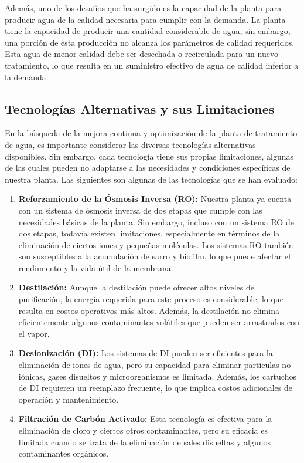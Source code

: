 Además, uno de los desafíos que ha surgido es la capacidad de la
planta para producir agua de la calidad necesaria para cumplir con la demanda.
La planta tiene la capacidad de producir una cantidad considerable de agua,
sin embargo, una porción de esta producción no alcanza los parámetros de
calidad requeridos. Esta agua de menor calidad debe ser desechada o
recirculada para un nuevo tratamiento, lo que resulta en un suministro
efectivo de agua de calidad inferior a la demanda.\\

\subsection{Tecnologías Alternativas y sus Limitaciones}

En la búsqueda de la mejora continua y optimización de la planta de tratamiento de agua,
es importante considerar las diversas tecnologías alternativas disponibles.
Sin embargo, cada tecnología tiene sus propias limitaciones, algunas de las
cuales pueden no adaptarse a las necesidades y condiciones específicas de nuestra planta.
Las siguientes son algunas de las tecnologías que se han evaluado:

\begin{enumerate}
    \item \textbf{Reforzamiento de la Ósmosis Inversa (RO):}  Nuestra planta ya cuenta con
          un sistema de ósmosis inversa de dos etapas que cumple con las necesidades
          básicas de la planta. Sin embargo, incluso con un sistema RO de dos etapas,
          todavía existen limitaciones, especialmente en términos de la eliminación de
          ciertos iones y pequeñas moléculas. Los sistemas RO también son susceptibles a
          la acumulación de sarro y biofilm, lo que puede afectar el rendimiento y
          la vida útil de la membrana.

    \item \textbf{Destilación:}  Aunque la destilación puede ofrecer altos niveles de
          purificación, la energía requerida para este proceso es considerable,
          lo que resulta en costos operativos más altos. Además, la destilación
          no elimina eficientemente algunos contaminantes volátiles que pueden ser arrastrados con el vapor.

    \item \textbf{Desionización (DI): } Los sistemas de DI pueden ser eficientes para
          la eliminación de iones de agua, pero su capacidad para eliminar
          partículas no iónicas, gases disueltos y microorganismos es limitada.
          Además, los cartuchos de DI requieren un reemplazo frecuente, lo que
          implica costos adicionales de operación y mantenimiento.

    \item \textbf{Filtración de Carbón Activado:}  Esta tecnología es efectiva para la
          eliminación de cloro y ciertos otros contaminantes, pero su eficacia es
          limitada cuando se trata de la eliminación de sales disueltas y
          algunos contaminantes orgánicos.

\end{enumerate}

